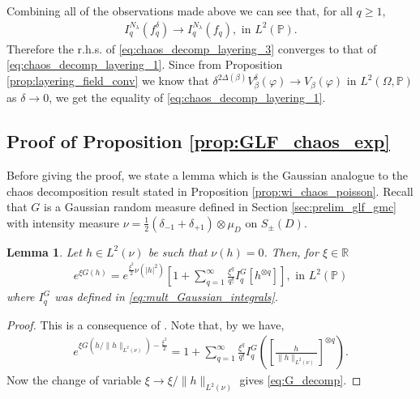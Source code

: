 \documentclass[a4paper, 11pt, reqno]{amsart}
\theoremstyle{definition} \newtheorem{defn}{Definition}[section]
\theoremstyle{remark} \newtheorem{rem}[defn]{Remark}
\theoremstyle{remark} \newtheorem*{rem*}{Remark}
\theoremstyle{plain} \newtheorem{thm}[defn]{Theorem}
\theoremstyle{plain} \newtheorem{lem}[defn]{Lemma}
\theoremstyle{plain} \newtheorem{prop}[defn]{Proposition}
\theoremstyle{plain} \newtheorem{cor}[defn]{Corollary}
\theoremstyle{remark} \newtheorem{exm}[defn]{\textbf{Example}}
\theoremstyle{remark} \newtheorem{exms}[defn]{\textbf{Examples}}
\theoremstyle{remark} \newtheorem*{bl}{}
\numberwithin{equation}{section} %
\newcommand{\R}{\mathbb{R}}
\newcommand{\pr}{\mathbb{P}}
\begin{document}
        Combining all of the observations made above we can see that, for all $q\ge 1$, 
		\begin{align}
			I^{N_{\lambda}}_q (f^{\delta}_q) \to I^{N_{\lambda}}_q (f_q), \text{ in } L^2(\pr).
		\end{align}
		Therefore the r.h.s. of \eqref{eq:chaos_decomp_layering_3} converges to that of \eqref{eq:chaos_decomp_layering_1}. Since from Proposition \ref{prop:layering_field_conv} we know that $\delta^{2\Delta(\beta)} V^{\delta}_{\beta}(\varphi) \to V_{\beta}(\varphi)$ in $ L^2(\Omega,\pr)$ as $\delta \to 0$, we get the equality of \eqref{eq:chaos_decomp_layering_1}.

    \subsection{Proof of Proposition \ref{prop:GLF_chaos_exp}} \label{app:proof_prop_GLF_chaos_exp}

    Before giving the proof, we state a lemma which is the Gaussian analogue to the chaos decomposition result stated in Proposition \ref{prop:wi_chaos_poisson}. %
    Recall that $G$ is a Gaussian random measure defined in Section \ref{sec:prelim_glf_gmc} with intensity measure $\nu = \frac{1}{2}(\delta_{-1} + \delta_{+1})\otimes \mu_D$ on $S_{\pm}(D)$.
    \begin{lem}\label{lem:wi_chaos_gaussian}
		Let $h \in L^2(\nu)$ be such that $\nu(h) = 0$. Then, for $\xi \in \R$
		\begin{align}\label{eq:G_decomp}
			e^{\xi G(h) } = e^{\frac{\xi^2}{2} \nu(|h|^2)} \left[1 + \sum_{q=1}^{\infty} \frac{\xi^q}{q!} I^G_q[ h^{\otimes q}]\right], \text{ in } L^2(\pr)
		\end{align}
		where $I^G_q$ was defined in \eqref{eq:mult_Gaussian_integrals}. 
	\end{lem}	

    \begin{proof}
        This is a consequence of \cite[Theorem 8.2.1]{pt11}. Note that, by \cite[Eq. (8.2.11)]{pt11} we have,
        \begin{align}
            e^{\xi G(h/\lVert h \rVert_{L^2(\nu)}) - \frac{\xi^2}{2}} = 1+ \sum_{q=1}^{\infty} \frac{\xi^q}{q!} I^G_q\left( \left[ \frac{h}{\lVert h \rVert_{L^2(\nu)}} \right]^{\otimes q}\right).
        \end{align}
        Now the change of variable $\xi \to \xi / \lVert h \rVert_{L^2(\nu)}$ gives \eqref{eq:G_decomp}.
    \end{proof}
\end{document}
